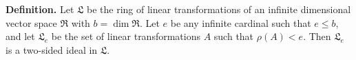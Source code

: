 \textbf{Definition.} Let $\mathfrak{L}$ be the ring of linear transformations of an infinite dimensional vector space $\mathfrak{R}$ with $b = \dim \mathfrak{R}$. Let $e$ be any infinite cardinal such that $e \leq b$, and let $\mathfrak{L}_e$ be the set of linear transformations $A$ such that $\rho(A) < e$. Then $\mathfrak{L}_e$ is a two-sided ideal in $\mathfrak{L}$.
